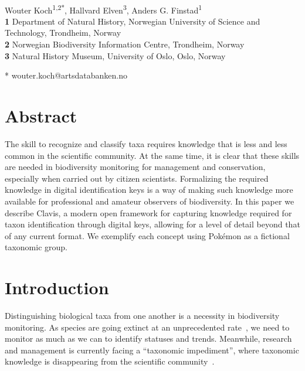 \documentclass[10pt,letterpaper]{article}
\begin{document}
\vspace*{0.2in}

\begin{flushleft}
{\Large
\textbf{}
}
\newline
\\
Wouter Koch\textsuperscript{1,2*},
Hallvard Elven\textsuperscript{3},
Anders G. Finstad\textsuperscript{1}
\\
\bigskip
\textbf{1} Department of Natural History, Norwegian University of Science and Technology, Trondheim, Norway
\\
\textbf{2} Norwegian Biodiversity Information Centre, Trondheim, Norway
\\
\textbf{3} Natural History Museum, University of Oslo, Oslo, Norway
\\
\bigskip

* wouter.koch@artsdatabanken.no

\end{flushleft}
\section*{
Abstract
}
The skill to recognize and classify taxa requires knowledge that is less and less common in the scientific community. At the same time, it is clear that these skills are needed in biodiversity monitoring for management and conservation, especially when carried out by citizen scientists. Formalizing the required knowledge in digital identification keys is a way of making such knowledge more available for professional and amateur observers of biodiversity. In this paper we describe Clavis, a modern open framework for capturing knowledge required for taxon identification through digital keys, allowing for a level of detail beyond that of any current format. We exemplify each concept using Pokémon as a fictional taxonomic group.
\section*{
Introduction
}
Distinguishing biological taxa from one another is a necessity in biodiversity monitoring. As species are going extinct at an unprecedented rate~\cite{Ceballos2015, Johnson2017}, we need to monitor as much as we can to identify statuses and trends. Meanwhile, research and management is currently facing a ``taxonomic impediment'', where taxonomic knowledge is disappearing from the scientific community~\cite{Engel2021}.
\end{document}
